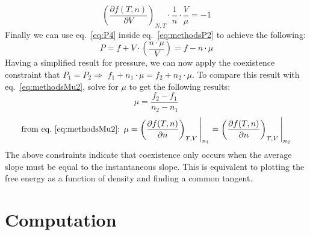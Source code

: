 \begin{equation}\label{eq:P4}
\left(\frac{\partial f(T,n)}{\partial V}\right)_{N,T} \cdot \frac{1}{n} \cdot \frac{V}{\mu}=-1
\end{equation}
Finally we can use eq.~\ref{eq:P4} inside eq.~\ref{eq:methodsP2} to achieve the following:
\begin{equation}\label{eq:P5}
P=f+V\cdot\left( \frac{n\cdot \mu}{V} \right)=f-n\cdot\mu
\end{equation}
Having a simplified result for pressure, we can now apply the coexistence constraint that $P_1=P_2 \Rightarrow$ $f_1+n_1\cdot\mu=f_2+n_2\cdot\mu$. To compare this result with eq.~\ref{eq:methodsMu2}, solve for $\mu$ to get the following results:
\begin{equation}\label{eq:mu3p}
\mu=\frac{f_2-f_1}{n_2-n_1}
\end{equation}
\begin{equation}\label{eq:mu3}
\text{from eq.~\ref{eq:methodsMu2}: }\mu= \left(\frac{\partial f(T,n)}{\partial n}\right)_{T,V}\Bigg|_{n_1}=\left(\frac{\partial f(T,n)}{\partial n}\right)_{T,V}\Bigg|_{n_2}
\end{equation}
The above constraints indicate that coexistence only occurs when the average slope must be equal to the instantaneous slope. This is equivalent to plotting the free energy as a function of density and finding a common tangent.

\newpage
\section{Computation}
\vspace*{-5mm}
